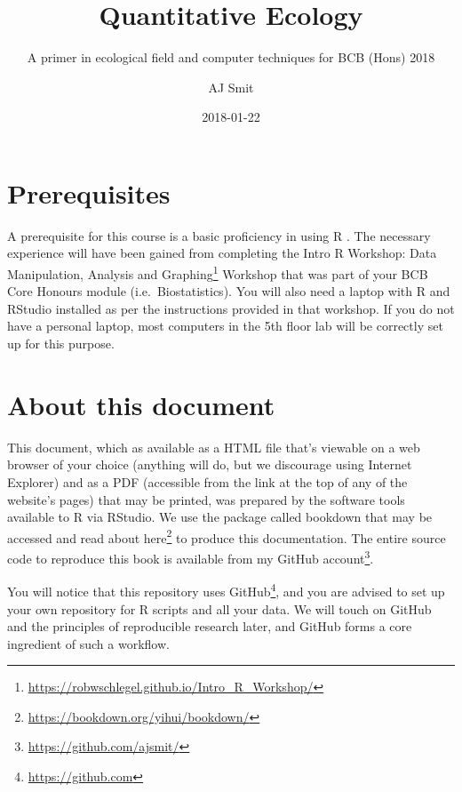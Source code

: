 \documentclass[english,10pt,a4paper,oneside]{book}
\title{Quantitative Ecology}
\subtitle{\sf A primer in ecological field and computer techniques for BCB (Hons) 2018}
\author{AJ Smit}
\date{2018-01-22}
\renewcommand{\href}[2]{#2\footnote{\url{#1}}}
\let\rmarkdownfootnote\footnote%
\def\footnote{\protect\rmarkdownfootnote}
\renewcommand\texttt[1]{{\ttfamily\color{ttcolor}#1}}
\theoremstyle{definition}
\theoremstyle{definition}
\theoremstyle{definition}
\theoremstyle{remark}
\begin{document}
\maketitle



{
\hypersetup{linkcolor=black}
\setcounter{tocdepth}{1}
\tableofcontents
}

\listoftables

\listoffigures

\chapter*{Prerequisites}\label{prerequisites}

A prerequisite for this course is a basic proficiency in using R
\citep{R2017}. The necessary experience will have been gained from
completing the
\href{https://robwschlegel.github.io/Intro_R_Workshop/}{Intro R
Workshop: Data Manipulation, Analysis and Graphing} Workshop that was
part of your BCB Core Honours module (i.e.~Biostatistics). You will also
need a laptop with R and RStudio installed as per the instructions
provided in that workshop. If you do not have a personal laptop, most
computers in the 5th floor lab will be correctly set up for this
purpose.

\chapter*{About this document}\label{about-this-document}

This document, which as available as a HTML file that's viewable on a
web browser of your choice (anything will do, but we discourage using
Internet Explorer) and as a PDF (accessible from the link at the top of
any of the website's pages) that may be printed, was prepared by the
software tools available to R via RStudio. We use the package called
\texttt{bookdown} that may be accessed and read about
\href{https://bookdown.org/yihui/bookdown/}{here} to produce this
documentation. The entire source code to reproduce this book is
available from my \href{https://github.com/ajsmit/}{GitHub account}.

You will notice that this repository uses
\href{https://github.com}{GitHub}, and you are advised to set up your
own repository for R scripts and all your data. We will touch on GitHub
and the principles of reproducible research later, and GitHub forms a
core ingredient of such a workflow.
\end{document}
